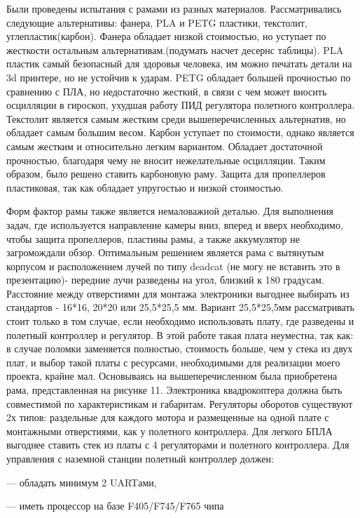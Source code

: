 Были проведены испытания с рамами из разных материалов. Рассматривались следующие альтернативы: фанера, PLA и PETG пластики, текстолит, углепластик(карбон). Фанера обладает низкой стоимостью, но уступает по жесткости остальным альтернативам.(подумать насчет десернс таблицы). PLA пластик самый безопасный для здоровья человека, им можно печатать детали на 3d принтере, но не устойчив к ударам. PETG обладает большей прочностью по сравнению с ПЛА, но недостаточно жесткий, в связи с чем может вносить осцилляции в гироскоп, ухудшая работу ПИД регулятора полетного контроллера. Текстолит является самым жестким среди вышеперечисленных альтернатив, но обладает самым большим весом. Карбон уступает по стоимости, однако является самым жестким и относительно легким вариантом. Обладает достаточной прочностью, благодаря чему не вносит нежелательные осцилляции. Таким образом, было решено ставить карбоновую раму.
Защита для пропеллеров пластиковая, так как обладает упругостью и низкой стоимостью.

Форм фактор рамы также является немаловажной деталью. Для выполнения задач, где используется направление камеры вниз, вперед и вверх необходимо, чтобы защита пропеллеров, пластины рамы, а также аккумулятор не загромождали обзор. Оптимальным решением является рама с вытянутым корпусом и расположением лучей по типу deadcat (не могу не вставить это в презентацию)- передние лучи разведены на угол, близкий к 180 градусам. Расстояние между отверстиями для монтажа электроники выгоднее выбирать из стандартов - 16*16, 20*20 или 25,5*25,5 мм. Вариант 25,5*25,5мм рассматривать стоит только в том случае, если необходимо использовать плату, где разведены и полетный контроллер и регулятор. В этой работе такая плата неуместна, так как: в случае поломки заменяется полностью, стоимость больше, чем у стека из двух плат, и выбор такой платы с ресурсами, необходимыми для реализации моего проекта, крайне мал. Основываясь на вышеперечисленном была приобретена рама, представленная на рисунке 11.
Электроника квадрокоптера должна быть совместимой по характеристикам и габаритам. Регуляторы оборотов существуют 2х типов: раздельные для каждого мотора и размещенные на одной плате с монтажными отверстиями, как у полетного контроллера. Для легкого БПЛА выгоднее ставить стек из платы с 4 регуляторами и полетного контроллера.
Для управления с наземной станции полетный контроллер должен:

--- обладать минимум 2 UARTами,

--- иметь процессор на базе F405/F745/F765 чипа

